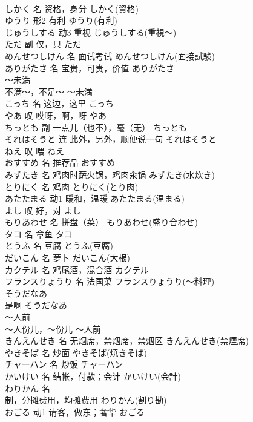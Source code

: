 \documentclass[8pt]{extreport}
\begin{document}
\begin{CJK}{UTF8}{min}
\\	しかく	名	资格，身分	しかく(資格)	
\\	ゆうり	形2	有利	ゆうり(有利)	
\\	じゅうしする	动3	重视	じゅうしする(重視～)	
\\	ただ	副	仅，只	ただ	
\\	めんせつしけん	名	面试考试	めんせつしけん(面接試験)	
\\	ありがたさ	名	宝贵，可贵，价值	ありがたさ	
\\	～未満	
\\	不满～，不足～	～未満	
\\	こっち	名	这边，这里	こっち	
\\	やあ	叹	哎呀，啊，呀	やあ	
\\	ちっとも	副	一点儿（也不），毫（无）	ちっとも	
\\	それはそうと	连	此外，另外，顺便说一句	それはそうと	
\\	ねえ	叹	喂	ねえ	
\\	おすすめ	名	推荐品	おすすめ	
\\	みずたき	名	鸡肉时蔬火锅，鸡肉汆锅	みずたき(水炊き)	
\\	とりにく	名	鸡肉	とりにく(とり肉)	
\\	あたたまる	动1	暖和，温暖	あたたまる(温まる)	
\\	よし	叹	好，对	よし	
\\	もりあわせ	名	拼盘（菜）	もりあわせ(盛り合わせ)	
\\	タコ	名	章鱼	タコ	
\\	とうふ	名	豆腐	とうふ(豆腐)	
\\	だいこん	名	萝卜	だいこん(大根)	
\\	カクテル	名	鸡尾酒，混合酒	カクテル	
\\	フランスりょうり	名	法国菜	フランスりょうり(～料理)	
\\	そうだなあ	
\\	是啊	そうだなあ	
\\	～人前	
\\	～人份儿，～份儿	～人前	
\\	きんえんせき	名	无烟席，禁烟席，禁烟区	きんえんせき(禁煙席)	
\\	やきそば	名	炒面	やきそば(焼きそば)	
\\	チャーハン	名	炒饭	チャーハン	
\\	かいけい	名	结帐，付款；会计	かいけい(会計)	
\\	わりかん	名	
\\	制，分摊费用，均摊费用	わりかん(割り勘)	
\\	おごる	动1	请客，做东；奢华	おごる	

\end{CJK}
\end{document}
